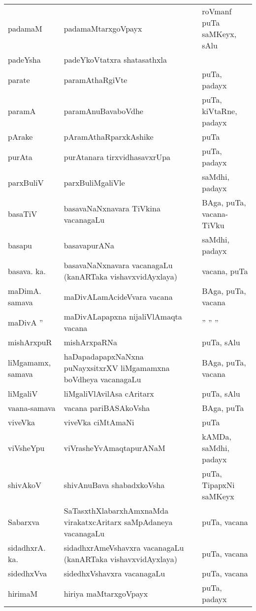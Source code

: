{\begin{longtable}{lll}
padamaM & padamaMtarxgoVpayx & roVmanf puTa saMKeyx, sAlu\\
padeYsha & padeYkoVtatxra shatasathxla & \\
parate & paramAthaRgiVte & puTa, padayx\\
paramA & paramAnuBavaboVdhe & puTa, kiVtaRne, padayx\\
pArake & pAramAthaRparxkAshike & puTa\\
purAta & purAtanara tirxvidhasavxrUpa & puTa, padayx\\
parxBuliV & parxBuliMgaliVle & saMdhi, padayx\\
basaTiV & basavaNaNxnavara TiVkina vacanagaLu & BAga, puTa, vacana-TiVku\\
basapu & basavapurANa & saMdhi, padayx\\
basava. ka. & basavaNaNxnavara vacanagaLu (kanARTaka vishavxvidAyxlaya) & vacana, puTa\\
maDimA. samava & maDivALamAcideVvara vacana & BAga, puTa, vacana\\
maDivA '' & maDivALapapxna nijaliVlAmaqta vacana & \qquad '' '' ''\\
mishArxpuR & mishArxpaRNa & puTa, sAlu\\
liMgamamx, samava & haDapadapapxNaNxna puNayxsitxrXV liMgamamxna boVdheya vacanagaLu & BAga, puTa, vacana\\
liMgaliV & liMgaliVlAvilAsa cAritarx & puTa, sAlu\\
vaana-samava & vacana pariBASAkoVsha & BAga, puTa\\
viveVka & viveVka ciMtAmaNi & puTa\\
viVsheYpu & viVrasheYvAmaqtapurANaM & kAMDa, saMdhi, padayx\\
shivAkoV & shivAnuBava shabadxkoVsha & puTa, TipapxNi saMKeyx\\
Sabarxva & SaTasxthXlabarxhAmxnaMda virakatxcAritarx saMpAdaneya vacanagaLu & puTa, vacana\\
sidadhxrA. ka. & sidadhxrAmeVshavxra vacanagaLu (kanARTaka vishavxvidAyxlaya) & puTa, vacana\\
sidedhxVva & sidedhxVshavxra vacanagaLu & puTa, vacana\\
hirimaM & hiriya maMtarxgoVpayx & puTa, padayx\\
\hline
\end{longtable}}


\newpage


